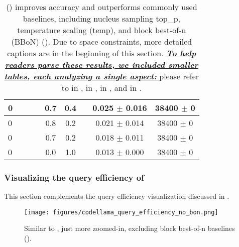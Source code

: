 \begin{table*}[!h]
\begin{center}
\begin{small}
\begin{tabular}{ lcccccccc }
\hline
0 &  &  &  & 0.7 & 0.4 &  &  0.025 $\pm$ 0.016 & 38400 $\pm$ 0  \\
\hline
0 &  &  &  & 0.8 & 0.2 &  &  0.021 $\pm$ 0.014 & 38400 $\pm$ 0  \\
\hline
0 &  &  &  & 0.7 & 0.2 &  &  0.018 $\pm$ 0.011 & 38400 $\pm$ 0  \\
\hline
0 &  &  &  & 0.0 & 1.0 &  &  0.013 $\pm$ 0.000 & 38400 $\pm$ 0  \\
\bottomrule
\end{tabular}
\end{small}
\end{center}
\vspace{-4mm}
\caption{
\algoName () improves accuracy
and outperforms commonly used baselines, including
nucleus sampling top\_p,
temperature scaling (temp),
and block best-of-n (BBoN) ().
Due to space constraints, more detailed captions are in the beginning of this section.
\underline{
\textit{
\textbf{
To help readers parse these results, we included smaller tables, each analyzing a single aspect:
}
}
}
please refer to 
 in ,
 in ,
 in ,
and  in .
}
\label{table:codellama_verifier_improves_accuracy}
\end{table*}





\clearpage
\subsubsection{Visualizing the query efficiency of \algoName}
\label{sec:experiments:codellama:visualize_efficiency}

This section complements the query efficiency visualization discussed in .


\begin{figure*}[!h]
  \centering
  \begin{minipage}[b]{1.0\textwidth}  %
    \centering
    \texttt{[image: figures/codellama\_query\_efficiency\_no\_bon.png]}  %
  \end{minipage}
  \caption{
  Similar to ,
  just more zoomed-in, 
  excluding block best-of-n baselines ().
  }  
  \label{fig:codellama_query_efficiency_no_bon}
\end{figure*}




